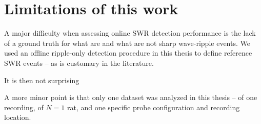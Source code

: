 \section{Limitations of this work}

A major difficulty when assessing online SWR detection performance is the lack of a ground truth for what are and what are not sharp wave-ripple events. We used an offline ripple-only detection procedure in this thesis to define reference SWR events -- as is customary in the literature.

It is then not surprising 

A more minor point is that only one dataset was analyzed in this thesis -- of one recording, of $N = 1$ rat, and one specific probe configuration and recording location.
